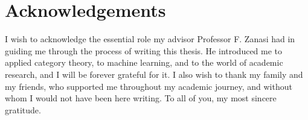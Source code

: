 \documentclass[11pt,a4paper,openright,twoside]{report}
\theoremstyle{plain}
\theoremstyle{definition}
\begin{document}
\clearpage{\pagestyle{empty}\cleardoublepage}







{}



\clearpage{\pagestyle{empty}\cleardoublepage}





\chapter*{Acknowledgements}

\thispagestyle{empty}

I wish to acknowledge the essential role my advisor Professor F. Zanasi had in guiding me through the process of writing this thesis. He introduced me to applied category theory, to machine learning, and to the world of academic research, and I will be forever grateful for it. I also wish to thank my family and my friends, who supported me throughout my academic journey, and without whom I would not have been here writing. To all of you, my most sincere gratitude.
\end{document}
